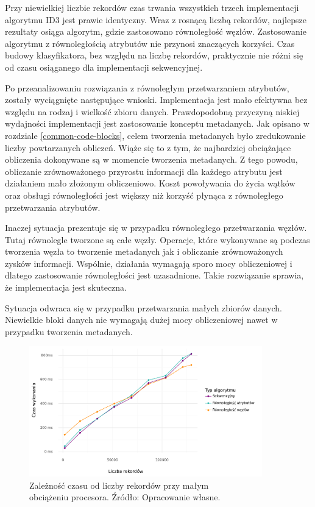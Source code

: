 \documentclass[12pt]{article}
\begin{document}
Przy niewielkiej liczbie rekordów czas trwania wszystkich trzech implementacji algorytmu ID3 jest prawie identyczny.
Wraz z rosnącą liczbą rekordów, najlepsze rezultaty osiąga algorytm, gdzie zastosowano równoległość węzłów. Zastosowanie
algorytmu z równoległością atrybutów nie przynosi znaczących korzyści. Czas budowy klasyfikatora, bez względu na liczbę rekordów,
praktycznie nie różni się od czasu osiąganego dla implementacji sekwencyjnej. 

Po przeanalizowaniu rozwiązania z równoległym przetwarzaniem atrybutów, zostały wyciągnięte następujące wnioski.
Implementacja jest mało efektywna bez względu na rodzaj i wielkość zbioru danych. Prawdopodobną przyczyną niskiej
wydajności implementacji jest zastosowanie konceptu metadanych. Jak opisano w rozdziale \ref{common-code-blocks}, celem tworzenia
metadanych było zredukowanie liczby powtarzanych obliczeń. Wiąże się to z tym, że najbardziej obciążające obliczenia
dokonywane są w momencie tworzenia metadanych. Z tego powodu, obliczanie zrównoważonego przyrostu informacji dla każdego
atrybutu jest działaniem mało złożonym obliczeniowo. Koszt powoływania do życia wątków oraz obsługi równoległości jest większy
niż korzyść płynąca z równoległego przetwarzania atrybutów.

Inaczej sytuacja prezentuje się w przypadku równoległego przetwarzania węzłów. Tutaj równolegle tworzone są całe węzły. Operacje, które wykonywane są
podczas tworzenia węzła to tworzenie metadanych jak i obliczanie zrównoważonych zysków informacji. Wspólnie, działania wymagają
sporo mocy obliczeniowej i dlatego zastosowanie równoległości jest uzasadnione. Takie rozwiązanie sprawia, że implementacja jest skuteczna.

Sytuacja odwraca się w przypadku przetwarzania małych zbiorów danych. Niewielkie bloki danych nie wymagają dużej mocy obliczeniowej
nawet w przypadku tworzenia metadanych.

\begin{figure}[H]
    \centering
	\includegraphics[width=0.9\textwidth]{analysis-start.pdf}
    \caption{Zależność czasu od liczby rekordów przy małym\\obciążeniu procesora. Źródło: Opracowanie własne.}
    \label{fig:analysis-start}
\end{figure}
\end{document}
